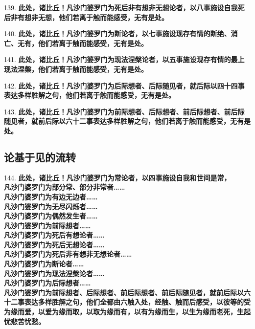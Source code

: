 {\Large 139.} \textbf{此处，诸比丘！凡沙门婆罗门为死后非有想非无想论者，以八事施设自我死后非有想非无想，他们若离于触而能感受，无有是处。}

{\Large 140.} \textbf{此处，诸比丘！凡沙门婆罗门为断论者，以七事施设现存有情的断绝、消亡、无有，他们若离于触而能感受，无有是处。}

{\Large 141.} \textbf{此处，诸比丘！凡沙门婆罗门为现法涅槃论者，以五事施设现存有情的最上现法涅槃，他们若离于触而能感受，无有是处。}

{\Large 142.} \textbf{此处，诸比丘！凡沙门婆罗门为后际想者、后际随见者，就后际以四十四事表达多样胜解之句，他们若离于触而能感受，无有是处。}

{\Large 143.} \textbf{此处，诸比丘！凡沙门婆罗门为前际想者、后际想者、前后际想者、前后际随见者，就前后际以六十二事表达多样胜解之句，他们若离于触而能感受，无有是处。}

\subsection{论基于见的流转}

{\Large 144.} \textbf{此处，诸比丘！凡沙门婆罗门为常论者，以四事施设自我和世间是常，}\\
\textbf{凡沙门婆罗门为部分常、部分非常者……}\\
\textbf{凡沙门婆罗门为有边无边者……}\\
\textbf{凡沙门婆罗门为无尽闪烁者……}\\
\textbf{凡沙门婆罗门为偶然发生者……}\\
\textbf{凡沙门婆罗门为前际想者……}\\
\textbf{凡沙门婆罗门为死后有想论者……}\\
\textbf{凡沙门婆罗门为死后无想论者……}\\
\textbf{凡沙门婆罗门为死后非有想非无想论者……}\\
\textbf{凡沙门婆罗门为断论者……}\\
\textbf{凡沙门婆罗门为现法涅槃论者……}\\
\textbf{凡沙门婆罗门为后际想者……}\\
\textbf{凡沙门婆罗门为前际想者、后际想者、前后际想者、前后际随见者，就前后际以六十二事表达多样胜解之句，他们全都由六触入处，经触、触而后感受，以彼等的受为缘而爱，以爱为缘而取，以取为缘而有，以有为缘而生，以生为缘而老死，生起忧悲苦忧愁。}

